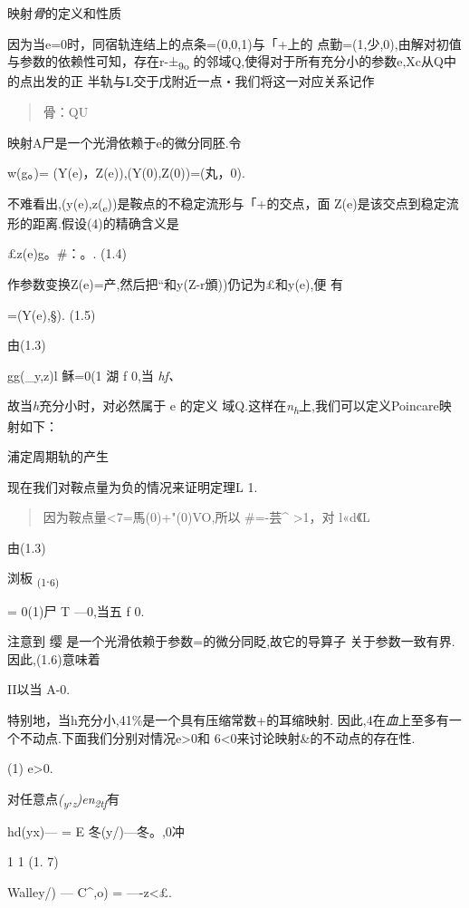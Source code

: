 \documentclass{article}
\begin{document}
映射\emph{骨}的定义和性质

因为当e=0时，同宿轨连结上的点条=(0,0,1)与「+上的
点勤=(1,少,0),由解对初值与参数的依赖性可知，存在r-±\textsubscript{9o}
的邻域Q,使得对于所有充分小的参数e,Xc从Q中的点出发的正
半轨与L交于戊附近一点・我们将这一对应关系记作

\begin{quote}
骨：QU
\end{quote}

映射A尸是一个光滑依赖于e的微分同胚.令

w(g。)= (Y(e)，Z(e)),(Y(0),Z(0))=(丸，0).

不难看出,(y(e),z(\textsubscript{e}))是鞍点的不稳定流形与「+的交点，面
Z(e)是该交点到稳定流形的距离.假设(4)的精确含义是

£z(e)\textbar{}g。\#：。. (1.4)

作参数变换Z(e)=产,然后把``和y(Z-r頒))仍记为£和y(e),便 有

=(Y(e),§). (1.5)

由(1.3)

gg(\_y,z)l 稣=0(1 湖 f 0,当 \emph{hf、}

故当\emph{h}充分小时，对必然属于 e 的定义
域Q.这样在\emph{n\textsubscript{h}}上,我们可以定义Poincare映射如下：

浦定周期轨的产生

现在我们对鞍点量为负的情况来证明定理L 1.

\begin{quote}
因为鞍点量\textless{}7=馬(0)+"(0)VO,所以 \#=-芸\^{} \textgreater{}1，对
l«d《L
\end{quote}

由(1.3)

浏板 \textsubscript{(1}.\textsubscript{6)}

= 0(1)尸 T ---0,当五 f 0.

注意到 缨 是一个光滑依赖于参数=的微分同眨,故它的导算子
关于参数一致有界.因此,(1.6)意味着

II以当 A-0.

特别地，当h充分小,41\%是一个具有压缩常数+的耳缩映射.
因此,4在\emph{血}上至多有一个不动点.下面我们分别对情况e\textgreater{}0和
6\textless{}0来讨论映射\&的不动点的存在性.

(1) e\textgreater{}0.

对任意点\emph{(\textsubscript{y},\textsubscript{z})en\textsubscript{2tf}}有

hd(yx)--- = E 冬(y/)---冬。,0冲

1 1 (1. 7)

Walley/) --- C\^{},o)\textbar{}\textbar{} = ----z\textless{}£.
\end{document}

